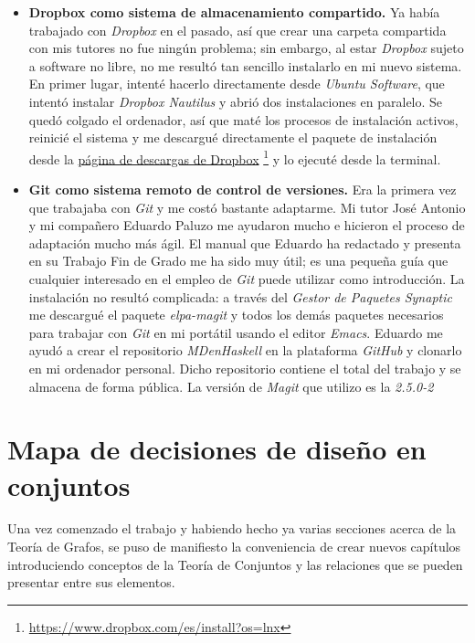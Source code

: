 \begin{itemize}
  \item \textbf{Dropbox como sistema de almacenamiento compartido.} Ya había 
    trabajado con \textit{Dropbox} en el pasado, así que crear una carpeta 
    compartida con mis tutores no fue ningún problema; sin embargo, al estar
    \textit{Dropbox} sujeto a software no libre, no me resultó tan sencillo
    instalarlo en mi nuevo sistema. En primer lugar, intenté hacerlo 
    directamente desde \textit{Ubuntu Software}, que intentó instalar 
    \textit{Dropbox Nautilus} y abrió dos instalaciones en paralelo. Se quedó 
    colgado el ordenador, así que maté los procesos de instalación activos,
    reinicié el sistema y me descargué directamente el paquete de instalación
    desde la 
    \href{https://www.dropbox.com/es/install?os=lnx}
    {página de descargas de Dropbox}
    \footnote{\url{https://www.dropbox.com/es/install?os=lnx}} y lo ejecuté
    desde la terminal.
  \item \textbf{Git como sistema remoto de control de versiones.} Era la 
    primera vez que trabajaba con \textit{Git} y me costó bastante adaptarme.
    Mi tutor José Antonio y mi compañero Eduardo Paluzo me ayudaron mucho e
    hicieron el proceso de adaptación mucho más ágil. 
    El manual que Eduardo ha redactado y presenta en su Trabajo Fin de Grado
    me ha sido muy útil; es una pequeña guía que cualquier interesado en el
    empleo de \textit{Git} puede utilizar como introducción.
    La instalación no resultó complicada: a través del \textit{Gestor de 
    Paquetes Synaptic} me descargué el paquete \textit{elpa-magit} y todos
    los demás paquetes necesarios para trabajar con \textit{Git} en mi
    portátil usando el editor \textit{Emacs}.
    Eduardo me ayudó a crear el repositorio \textit{MDenHaskell} en la 
    plataforma \textit{GitHub} y clonarlo en mi ordenador personal. Dicho
    repositorio contiene el total del trabajo y se almacena de forma pública.
    La versión de \textit{Magit} que utilizo es la \textit{2.5.0-2}
\end{itemize}

\section{Mapa de decisiones de diseño en conjuntos}

Una vez comenzado el trabajo y habiendo hecho ya varias secciones acerca de la
Teoría de Grafos, se puso de manifiesto la conveniencia de crear nuevos 
capítulos introduciendo conceptos de la Teoría de Conjuntos y las relaciones
que se pueden presentar entre sus elementos. 

